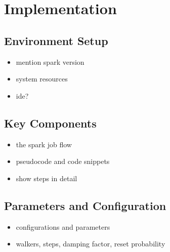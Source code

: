 \section{Implementation}
\subsection{Environment Setup}
\begin{itemize}
    \item mention spark version
    \item system resources
    \item ide?
\end{itemize}

\subsection{Key Components}
\begin{itemize}
    \item the spark job flow 
    \item pseudocode and code snippets
    \item show steps in detail
\end{itemize}

\subsection{Parameters and Configuration}
\begin{itemize}
    \item configurations and parameters
    \item walkers, steps, damping factor, reset probability
\end{itemize}